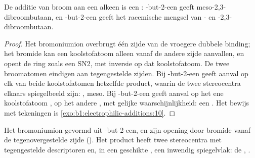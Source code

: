 \begin{proposition}\label{prop:b1:electrophilic-additions:anti-addition}
De additie van broom aan een alkeen is een : -but-2-een
geeft meso-2,3-dibroombutaan, en -but-2-een geeft het racemische
mengsel van - en -2,3-dibroombutaan.
\end{proposition}

\begin{proof}
Het bromoniumion overbrugt één zijde van de vroegere dubbele binding; het
bromide kan een koolstofatoom alleen vanaf de andere zijde aanvallen, en
opent de ring zoals een SN2, met inversie op dat koolstofatoom. De twee
broomatomen eindigen aan tegengestelde zijden. Bij -but-2-een
geeft aanval op elk van beide koolstofatomen hetzelfde product, waarin de
twee stereocentra elkaars spiegelbeeld zijn: , meso. Bij
-but-2-een geeft aanval op het ene koolstofatoom , op
het andere , met gelijke waarschijnlijkheid: een . Het bewijs met tekeningen is
\cref{exo:b1:electrophilic-additions:10}.
\end{proof}

\begin{omfigure}

{\small Het bromoniumion gevormd uit -but-2-een, en zijn opening
door bromide vanaf de tegenovergestelde zijde (). Het product
heeft twee stereocentra met tegengestelde descriptoren en, in een
geschikte , een inwendig spiegelvlak: de ,
.}
\end{omfigure}

